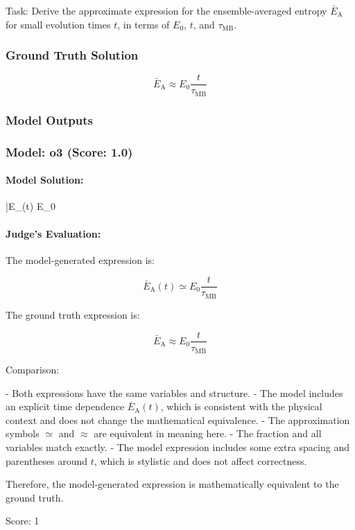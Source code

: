 \documentclass[10pt]{article}
\begin{document}
Task:
Derive the approximate expression for the ensemble-averaged entropy $\bar E_\mathrm{A}$ for small evolution times $t$, in terms of $E_0$, $t$, and $\tau_{\text{MB}}$.

\subsubsection*{Ground Truth Solution}
\[ \boxed{\bar E_\mathrm{A} \approx E_0 \frac{t}{\tau_\mathrm{MB}}} \]

\subsubsection*{Model Outputs}
\subsubsection*{Model: o3 (Score: 1.0)}
\paragraph*{Model Solution:}
\; \bar E_{}(t)\;\simeq\; E_{0}\, \;

\paragraph*{Judge's Evaluation:}

The model-generated expression is:

\[
\bar E_{\mathrm{A}}(t) \simeq E_0 \frac{t}{\tau_{\mathrm{MB}}}
\]

The ground truth expression is:

\[
\bar E_\mathrm{A} \approx E_0 \frac{t}{\tau_\mathrm{MB}}
\]

Comparison:

- Both expressions have the same variables and structure.
- The model includes an explicit time dependence \(\bar E_{\mathrm{A}}(t)\), which is consistent with the physical context and does not change the mathematical equivalence.
- The approximation symbols \(\simeq\) and \(\approx\) are equivalent in meaning here.
- The fraction and all variables match exactly.
- The model expression includes some extra spacing and parentheses around \(t\), which is stylistic and does not affect correctness.

Therefore, the model-generated expression is mathematically equivalent to the ground truth.

Score: 1

\newpage
\end{document}
